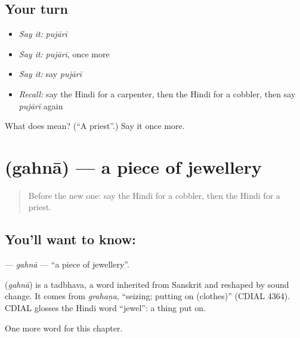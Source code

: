 \subsection*{Your turn}
\begin{itemize}
\raggedright
  \item \emph{Say it:} \emph{pujārī}
  \item \emph{Say it:} \emph{pujārī}, once more
  \item \emph{Say it:} say \emph{pujārī}
  \item \emph{Recall:} say the Hindi for a carpenter, then the Hindi for a cobbler, then say \emph{pujārī} again
\end{itemize}

\begin{tcolorbox}[breakable,colback=teal!4,colframe=teal!35!black,title={Before you move on}]
What does  mean? (\textquotedblleft{}A priest\textquotedblright{}.) Say it once more.
\end{tcolorbox}
\section[\texorpdfstring{\hi{गहना} (gahnā)}{गहना (gahnā)}]{ (gahnā) — a piece of jewellery}

\label{lesson:HI-C262-gahna}



\begin{quote}
Before the new one: say the Hindi for a cobbler, then the Hindi for a priest.
\end{quote}

\subsection*{You'll want to know: }
\textbf{} — \emph{gahnā} — \textquotedblleft{}a piece of jewellery\textquotedblright{}.

\begin{cousinweb}
\textbf{} (\emph{gahnā}) is a tadbhava, a word inherited from Sanskrit and reshaped by sound change. It comes from \emph{grahaṇa}, \textquotedblleft{}seizing; putting on (clothes)\textquotedblright{} (CDIAL 4364). CDIAL glosses the Hindi word \textquotedblleft{}jewel\textquotedblright{}: a thing put on.
\end{cousinweb}

\begin{grammarlens}[title={What you've built}]
One more word for this chapter.
\end{grammarlens}

